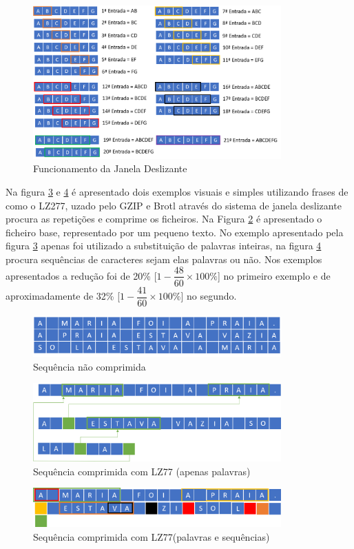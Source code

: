 \begin{figure}[htb]
\centering
\includegraphics[width=0.85\textwidth]{images/janeladeslizantedicionario.png}
\caption{Funcionamento da Janela Deslizante}\label{janela}
\end{figure}


\par Na figura \ref{gzip} e \ref{gzip2} é apresentado dois exemplos visuais e simples utilizando frases de como o LZ277, uzado pelo GZIP e Brotl através do sistema de janela deslizante procura as repetições e comprime os ficheiros. Na Figura \ref{unzip} é apresentado o ficheiro base, representado por um pequeno texto. No exemplo apresentado pela figura \ref{gzip} apenas foi utilizado a substituição de palavras inteiras, na figura \ref{gzip2} procura sequências de caracteres sejam elas palavras ou não. Nos exemplos apresentados a redução foi de 20\% [$1-\dfrac{48}{60}\times100\%$] no primeiro exemplo e de aproximadamente de 32\% [$1-\dfrac{41}{60}\times100\%$] no segundo.
\begin{figure}[htb]
\centering
\includegraphics[width=0.85\textwidth]{images/FILE.png}
\caption{Sequência não comprimida}\label{unzip}
\end{figure}

\begin{figure}[htb]
\centering
\includegraphics[width=0.85\textwidth]{images/gzip.png}
\caption{Sequência comprimida com LZ77 (apenas palavras)}\label{gzip}
\end{figure}
\begin{figure}[htb]
\centering
\includegraphics[width=0.85\textwidth]{images/gzip2.png}
\caption{Sequência comprimida com LZ77(palavras e sequências)}\label{gzip2}
\end{figure}


